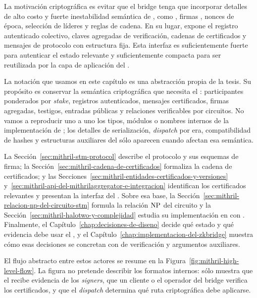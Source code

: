 La motivación criptográfica es evitar que el bridge tenga que incorporar detalles de alto costo y fuerte inestabilidad semántica de \Praos, como \VRF, firmas \KES, nonces de época, selección de líderes y reglas de cadena. En su lugar, \Mithril expone el registro autenticado colectivo, claves agregadas de verificación, cadenas de certificados y mensajes de protocolo con estructura fija. Esta interfaz es suficientemente fuerte para autenticar el estado relevante y suficientemente compacta para ser reutilizada por la capa de aplicación del \zkBridge.

La notación que usamos en este capítulo es una abstracción propia de la tesis. Su propósito es conservar la semántica criptográfica que necesita el \zkBridge: participantes ponderados por \textit{stake}, registros autenticados, mensajes certificados, firmas agregadas, testigos, entradas públicas y relaciones verificables por circuitos. No vamos a reproducir uno a uno los tipos, módulos o nombres internos de la implementación de \Mithril; los detalles de serialización, \textit{dispatch} por era, compatibilidad de hashes y estructuras auxiliares del \MithrilAggregator sólo aparecen cuando afectan esa semántica.

La Sección~\ref{sec:mithril-stm-protocol} describe el protocolo \STM y sus esquemas de firma; la Sección~\ref{sec:mithril-cadena-de-certificados} formaliza la cadena de certificados; y las Secciones~\ref{sec:mithril-entidades-certificados-y-versiones} y~\ref{sec:mithril-api-del-mithrilaggregator-e-integracion} identifican los certificados relevantes y presentan la interfaz del \MithrilAggregator. Sobre esa base, la Sección~\ref{sec:mithril-relacion-np-del-circuito-stm} formula la relación $\mathrm{NP}$ del circuito \STM y la Sección~\ref{sec:mithril-halotwo-y-complejidad} estudia su implementación en \HaloTwo con \KZG. Finalmente, el Capítulo~\ref{chap:decisiones-de-diseno} decide qué estado y qué evidencia debe usar el \zkBridge, y el Capítulo~\ref{chap:implementacion-del-zkbridge} muestra cómo esas decisiones se concretan con \ProofReceipt de verificación \STM y argumentos \Groth auxiliares.

El flujo abstracto entre estos actores se resume en la Figura~\ref{fig:mithril-high-level-flow}. La figura no pretende describir los formatos internos: sólo muestra que el \MithrilAggregator recibe evidencia de los \textit{signers}, que un cliente o el operador del bridge verifica los certificados, y que el \textit{dispatch} determina qué ruta criptográfica debe aplicarse.

